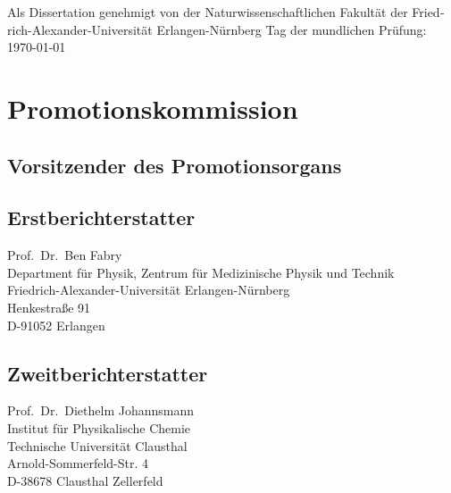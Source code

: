 \begin{otherlanguage}{german}
  Als Dissertation genehmigt von der Naturwissenschaftlichen Fakultät der
  Friedrich-Alexander-Universität Erlangen-Nürnberg
  \vspace{0.5cm}
  Tag der mundlichen Prüfung: \today\\
  \vspace{0.5cm}

  \section*{Promotionskommission}
  \subsection*{Vorsitzender des Promotionsorgans}

  \subsection*{Erstberichterstatter}
  Prof.~Dr.~Ben Fabry\\
  Department für Physik, Zentrum für Medizinische Physik und Technik\\
  Friedrich-Alexander-Universität Erlangen-Nürnberg\\
  Henkestraße 91\\
  D-91052 Erlangen
  \subsection*{Zweitberichterstatter}
  Prof.~Dr.~Diethelm Johannsmann\\
  Institut für Physikalische Chemie\\
  Technische Universität Clausthal\\
  Arnold-Sommerfeld-Str. 4\\
  D-38678 Clausthal Zellerfeld
\end{otherlanguage}

